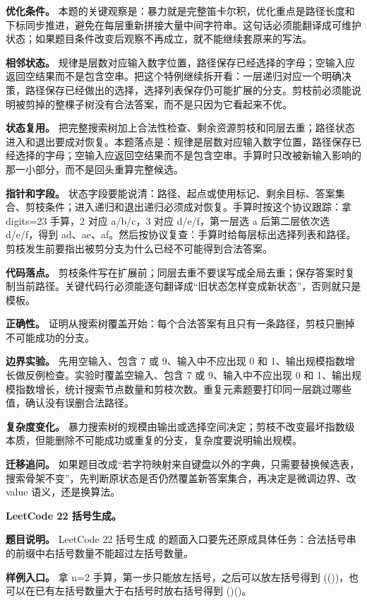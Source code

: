 \textbf{优化条件。} 本题的关键观察是：暴力就是完整笛卡尔积，优化重点是路径长度和下标同步推进，避免在每层重新拼接大量中间字符串。这句话必须能翻译成可维护状态；如果题目条件改变后观察不再成立，就不能继续套原来的写法。

\textbf{相邻状态。} 规律是层数对应输入数字位置，路径保存已经选择的字母；空输入应返回空结果而不是包含空串。把这个特例继续拆开看：一层递归对应一个明确决策，路径保存已经做出的选择，选择列表保存仍可能扩展的分支。剪枝前必须能说明被剪掉的整棵子树没有合法答案，而不是只因为它看起来不优。

\textbf{状态复用。} 把完整搜索树加上合法性检查、剩余资源剪枝和同层去重；路径状态进入和退出要成对恢复。本题落点是：规律是层数对应输入数字位置，路径保存已经选择的字母；空输入应返回空结果而不是包含空串。手算时只改被新输入影响的那一小部分，而不是回头重算完整候选。

\textbf{指针和字段。} 状态字段要能说清：路径、起点或使用标记、剩余目标、答案集合、剪枝条件；进入递归和退出递归必须成对恢复。手算时按这个协议跟踪：拿 digits=23 手算，2 对应 a/b/c，3 对应 d/e/f，第一层选 a 后第二层依次选 d/e/f，得到 ad、ae、af。然后按协议复查：手算时给每层标出选择列表和路径。剪枝发生前要指出被剪分支为什么已经不可能得到合法答案。

\textbf{代码落点。} 剪枝条件写在扩展前；同层去重不要误写成全局去重；保存答案时复制当前路径。关键代码行必须能逐句翻译成“旧状态怎样变成新状态”，否则就只是模板。

\textbf{正确性。} 证明从搜索树覆盖开始：每个合法答案有且只有一条路径，剪枝只删掉不可能成功的分支。

\textbf{边界实验。} 先用空输入、包含 7 或 9、输入中不应出现 0 和 1、输出规模指数增长做反例检查。实验时覆盖空输入、包含 7 或 9、输入中不应出现 0 和 1、输出规模指数增长，统计搜索节点数量和剪枝次数。重复元素题要打印同一层跳过哪些值，确认没有误删合法路径。

\textbf{复杂度变化。} 暴力搜索树的规模由输出或选择空间决定；剪枝不改变最坏指数级本质，但能删除不可能成功或重复的分支，复杂度要说明输出规模。

\textbf{迁移追问。} 如果题目改成“若字符映射来自键盘以外的字典，只需要替换候选表，搜索骨架不变”，先判断原状态是否仍然覆盖新答案集合，再决定是微调边界、改 value 语义，还是换算法。

\noindent\textbf{LeetCode 22 括号生成。}

\textbf{题目说明。} LeetCode 22 括号生成 的题面入口要先还原成具体任务：合法括号串的前缀中右括号数量不能超过左括号数量。

\textbf{样例入口。} 拿 n=2 手算，第一步只能放左括号，之后可以放左括号得到 (())，也可以在已有左括号数量大于右括号时放右括号得到 ()()。

